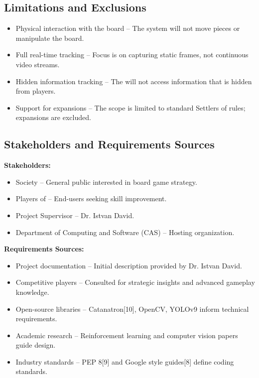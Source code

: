 \documentclass{article}
\begin{document}
\subsection{Limitations and Exclusions}\label{subsec:limitations-and-exclusions}
\begin{itemize}
    \item {Physical interaction with the board} – The system will not move pieces or manipulate the board.
    \item {Full real-time tracking} – Focus is on capturing static frames, not continuous video streams.
    \item {Hidden information tracking} – The \AI{} will not access information that is hidden from players.
    \item {Support for expansions} – The scope is limited to standard Settlers of \emph{\Catan{}} rules; expansions are excluded.
\end{itemize}

\subsection{Stakeholders and Requirements Sources}\label{subsec:stakeholders-and-requirements-sources}
\textbf{Stakeholders:}
\begin{itemize}
    \item Society – General public interested in board game strategy.
    \item Players of \emph{\Catan{}} – End-users seeking skill improvement.
    \item Project Supervisor – Dr. Istvan David.
    \item Department of Computing and Software (CAS) – Hosting organization.
\end{itemize}

\noindent\textbf{Requirements Sources:}
\begin{itemize}
    \item Project documentation – Initial description provided by Dr. Istvan David.
    \item Competitive \emph{\Catan{}} players – Consulted for strategic insights and advanced gameplay knowledge.
    \item Open-source libraries – Catanatron[10], OpenCV, YOLOv9 inform technical requirements.
    \item Academic research – Reinforcement learning and computer vision papers guide \AI{} design.
    \item Industry standards – PEP 8[9] and Google style guides[8] define coding standards.
\end{itemize}
\end{document}
